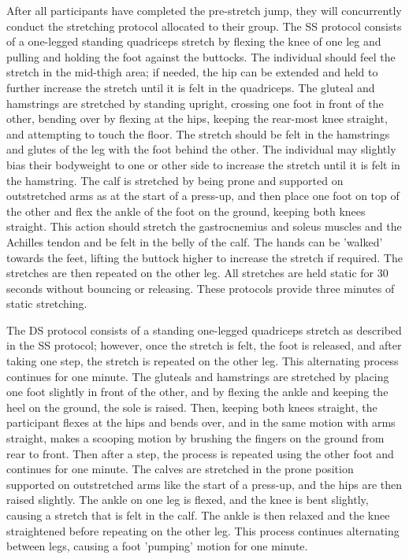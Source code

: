 \documentclass[stu, floatsintext, a4paper]{apa7}
\begin{document}
After all participants have completed the pre-stretch jump, they will concurrently conduct the stretching protocol allocated to their group. The SS protocol consists of a one-legged standing quadriceps stretch by flexing the knee of one leg and pulling and holding the foot against the buttocks. The individual should feel the stretch in the mid-thigh area; if needed, the hip can be extended and held to further increase the stretch until it is felt in the quadriceps. The gluteal and hamstrings are stretched by standing upright, crossing one foot in front of the other, bending over by flexing at the hips, keeping the rear-most knee straight, and attempting to touch the floor. The stretch should be felt in the hamstrings and glutes of the leg with the foot behind the other. The individual may slightly bias their bodyweight to one or other side to increase the stretch until it is felt in the hamstring. The calf is stretched by being prone and supported on outstretched arms as at the start of a press-up, and then place one foot on top of the other and flex the ankle of the foot on the ground, keeping both knees straight. This action should stretch the gastrocnemius and soleus muscles and the Achilles tendon and be felt in the belly of the calf. The hands can be 'walked' towards the feet, lifting the buttock higher to increase the stretch if required. The stretches are then repeated on the other leg. All stretches are held static for 30 seconds without bouncing or releasing. These protocols provide three minutes of static stretching.

The DS protocol consists of a standing one-legged quadriceps stretch as described in the SS protocol; however, once the stretch is felt, the foot is released, and after taking one step, the stretch is repeated on the other leg. This alternating process continues for one minute. The gluteals and hamstrings are stretched by placing one foot slightly in front of the other, and by flexing the ankle and keeping the heel on the ground, the sole is raised. Then, keeping both knees straight, the participant flexes at the hips and bends over, and in the same motion with arms straight, makes a scooping motion by brushing the fingers on the ground from rear to front. Then after a step, the process is repeated using the other foot and continues for one minute. The calves are stretched in the prone position supported on outstretched arms like the start of a press-up, and the hips are then raised slightly. The ankle on one leg is flexed, and the knee is bent slightly, causing a stretch that is felt in the calf. The ankle is then relaxed and the knee straightened before repeating on the other leg. This process continues alternating between legs, causing a foot 'pumping' motion for one minute.
\end{document}
